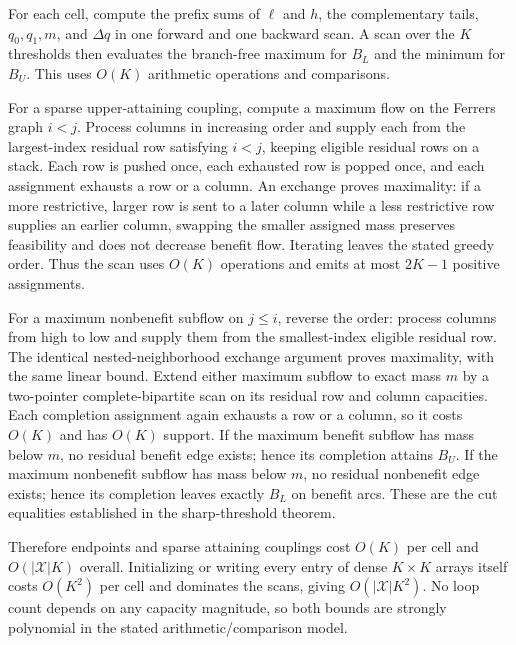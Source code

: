 For each cell, compute the prefix sums of \(\ell\) and \(h\), the complementary tails, \(q_0,q_1,m\), and \(\Delta q\) in one forward and one backward scan.  A scan over the \(K\) thresholds then evaluates the branch-free maximum for \(B_L\) and the minimum for \(B_U\).  This uses \(O(K)\) arithmetic operations and comparisons.

For a sparse upper-attaining coupling, compute a maximum flow on the Ferrers graph \(i<j\).  Process columns in increasing order and supply each from the largest-index residual row satisfying \(i<j\), keeping eligible residual rows on a stack.  Each row is pushed once, each exhausted row is popped once, and each assignment exhausts a row or a column.  An exchange proves maximality: if a more restrictive, larger row is sent to a later column while a less restrictive row supplies an earlier column, swapping the smaller assigned mass preserves feasibility and does not decrease benefit flow.  Iterating leaves the stated greedy order.  Thus the scan uses \(O(K)\) operations and emits at most \(2K-1\) positive assignments.

For a maximum nonbenefit subflow on \(j\le i\), reverse the order: process columns from high to low and supply them from the smallest-index eligible residual row.  The identical nested-neighborhood exchange argument proves maximality, with the same linear bound.  Extend either maximum subflow to exact mass \(m\) by a two-pointer complete-bipartite scan on its residual row and column capacities.  Each completion assignment again exhausts a row or a column, so it costs \(O(K)\) and has \(O(K)\) support.  If the maximum benefit subflow has mass below \(m\), no residual benefit edge exists; hence its completion attains \(B_U\).  If the maximum nonbenefit subflow has mass below \(m\), no residual nonbenefit edge exists; hence its completion leaves exactly \(B_L\) on benefit arcs.  These are the cut equalities established in the sharp-threshold theorem.

Therefore endpoints and sparse attaining couplings cost \(O(K)\) per cell and \(O(|\mathcal X|K)\) overall.  Initializing or writing every entry of dense \(K\times K\) arrays itself costs \(O(K^2)\) per cell and dominates the scans, giving \(O(|\mathcal X|K^2)\).  No loop count depends on any capacity magnitude, so both bounds are strongly polynomial in the stated arithmetic/comparison model.